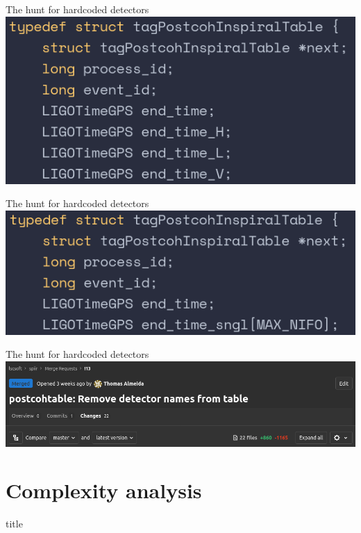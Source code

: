 \documentclass{beamer}
\begin{document}
\begin{frame}{The hunt for hardcoded detectors}
    \centering
    \includegraphics[width=\textwidth]{names-old.png}
\end{frame}

\begin{frame}{The hunt for hardcoded detectors}
    \centering
    \includegraphics[width=\textwidth]{names-new.png}
\end{frame}

\begin{frame}{The hunt for hardcoded detectors}
    \centering
    \includegraphics[width=\textwidth]{names-new-lines.png}
\end{frame}

\section{Complexity analysis}

\begin{frame}
  \vfill
  \centering
  \begin{beamercolorbox}[sep=8pt,center,shadow=true,rounded=true]{title}
    \insertsectionhead\par%
  \end{beamercolorbox}
  \vfill
\end{frame}
\end{document}
